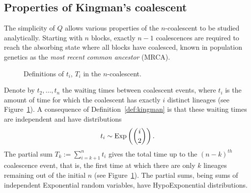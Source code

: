 \subsection{Properties of Kingman's coalescent}\label{sec:KCproperties}
The simplicity of $Q$ allows various properties of the $n$-coalescent to be studied analytically.
Starting with $n$ blocks, exactly $n-1$ coalescences are required to reach the absorbing state where all blocks have coalesced, known in population genetics as the \emph{most recent common ancestor} (MRCA).

\begin{figure}[ht]
\centering
{}
\caption{Definitions of $t_i$, $T_i$ in the $n$-coalescent.}
\label{fig:KC_timedefns}
\end{figure}

Denote by $t_2, \dots, t_n$ the waiting times between coalescent events, where $t_i$ is the amount of time for which the coalescent has exactly $i$ distinct lineages (see Figure~\ref{fig:KC_timedefns}).
A consequence of Definition~\ref{def:kingman} is that these waiting times are independent and have distributions
\begin{equation*}
t_i \sim \operatorname{Exp}\left( \binom{i}{2} \right) .
\end{equation*}
The partial sum $T_k := \sum_{i=k+1}^n t_i$ gives the total time up to the $(n-k)^{th}$ coalescence event, that is, the first time at which there are only $k$ lineages remaining out of the initial $n$ (see Figure~\ref{fig:KC_timedefns}).
The partial sums, being sums of independent Exponential random variables, have HypoExponential distributions.

